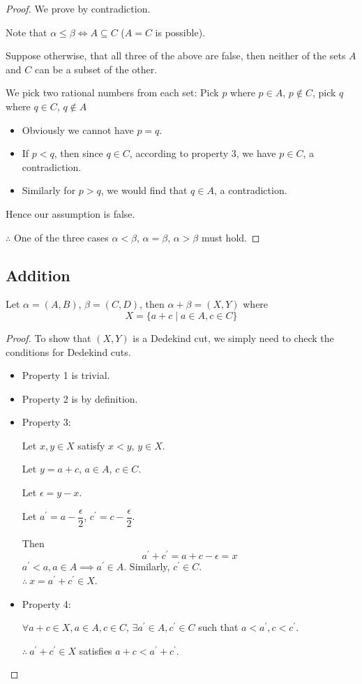 \begin{proof}
We prove by contradiction.

Note that $\alpha \le \beta \iff A \subseteq C$ ($A=C$ is possible).

Suppose otherwise, that all three of the above are false, then neither of the sets $A$ and $C$ can be a subset of the other.

We pick two rational numbers from each set:
Pick $p$ where $p \in A$, $p \notin C$, pick $q$ where $q \in C$, $q \notin A$
\begin{itemize}
\item Obviously we cannot have $p=q$.
\item If $p<q$, then since $q \in C$, according to property 3, we have $p \in C$, a contradiction.
\item Similarly for $p>q$, we would find that $q \in A$, a contradiction.
\end{itemize}

Hence our assumption is false.

$\therefore$ One of the three cases $\alpha < \beta$, $\alpha = \beta$, $\alpha > \beta$ must hold.
\end{proof}
\pagebreak

\subsection{Addition}
\begin{property}[Addition]
Let $\alpha = (A,B)$, $\beta = (C,D)$, then $\alpha + \beta = (X,Y)$ where
\[ X = \{a+c \mid a \in A, c \in C\} \]
\end{property}

\begin{proof}
To show that $(X,Y)$ is a Dedekind cut, we simply need to check the conditions for Dedekind cuts. 
\begin{itemize}
\item Property 1 is trivial.

\item Property 2 is by definition.

\item Property 3:

Let $x,y \in X$ satisfy $x<y$, $y \in X$. 

Let $y = a + c$, $a \in A$, $c \in C$.

Let $\epsilon = y - x$.

Let $a^\prime = a - \dfrac{\epsilon}{2}$, $c^\prime = c - \dfrac{\epsilon}{2}$.

Then \[ a^\prime + c^\prime = a + c - \epsilon = x \]
$a^\prime < a, a \in A \implies a^\prime \in A$. Similarly, $c^\prime \in C$.\\
$\therefore\:x = a^\prime +c^\prime \in X$.

\item Property 4:

$\forall a+c \in X, a \in A, c \in C$, $\exists a^\prime \in A, c^\prime \in C$ such that $a<a^\prime, c<c^\prime$.

$\therefore\:a^\prime +c^\prime \in X$ satisfies $a+c < a^\prime+c^\prime$.
\end{itemize}
\end{proof}

